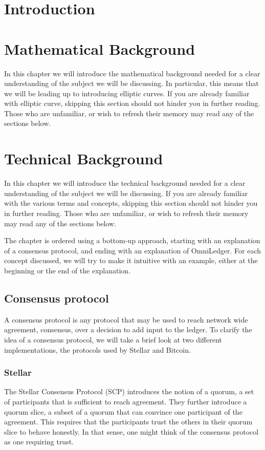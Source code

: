 \documentclass[12pt]{report}
\theoremstyle{plain}
\theoremstyle{definition}
\begin{document}
	\chapter{Introduction}
	\chapter{Mathematical Background}
	In this chapter we will introduce the mathematical background needed for a clear understanding of the subject we will be discussing. In particular, this means that we will be leading up to introducing elliptic curves. If you are already familiar with elliptic curve, skipping this section should not hinder you in further reading. Those who are unfamiliar, or wish to refresh their memory may read any of the sections below.
	\chapter{Technical Background}
	In this chapter we will introduce the technical background needed for a clear understanding of the subject we will be discussing. If you are already familiar with the various terms and concepts, skipping this section should not hinder you in further reading. Those who are unfamiliar, or wish to refresh their memory may read any of the sections below.

The chapter is ordered using a bottom-up approach, starting with an explanation of a consensus protocol, and ending with an explanation of OmniLedger. For each concept discussed, we will try to make it intuitive with an example, either at the beginning or the end of the explanation.
	\section{Consensus protocol}
	A consensus protocol is any protocol that may be used to reach network wide agreement, consensus, over a decision to add input to the ledger.\cite{ibmconsensus} To clarify the idea of a consensus protocol, we will take a brief look at two different implementations, the protocols used by Stellar and Bitcoin.
	\subsection{Stellar}
	The Stellar Consensus Protocol (SCP) introduces the notion of a quorum, a set of participants that is sufficient to reach agreement. They further introduce a quorum slice, a subset of a quorum that can convince one participant of the agreement. This requires that the participants trust the others in their quorum slice to behave honestly. In that sense, one might think of the consensus protocol as one requiring trust.
	
\end{document}
